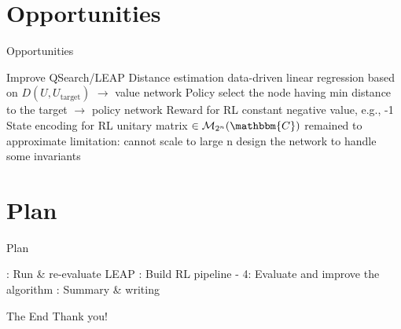 \documentclass{beamer}
\begin{document}
\section{Opportunities}
\begin{frame}{Opportunities}
    \begin{outline}
        \1 Improve QSearch/LEAP
            \2 Distance estimation
                \3 data-driven linear regression based on $D(U, U_{\text{target}})$ $\rightarrow$ value network
            \2 Policy
                \3 select the node having min distance to the target $\rightarrow$ policy network
            \2 Reward for RL
                \3 constant negative value, e.g., -1
            \2 State encoding for RL
                \3 unitary matrix $\in \mathcal{M}_{2^n}(\mathbbm{C})$ remained to approximate
                \3 limitation: cannot scale to large n
                \3 design the network to handle some invariants
    \end{outline}
\end{frame}

\section{Plan}
\begin{frame}{Plan}
    \begin{outline}
        : Run \& re-evaluate LEAP
        : Build RL pipeline
         - 4: Evaluate and improve the algorithm
        : Summary \& writing
    \end{outline}
\end{frame}

\begin{frame}{The End}
    Thank you!    
\end{frame}

\end{document}
